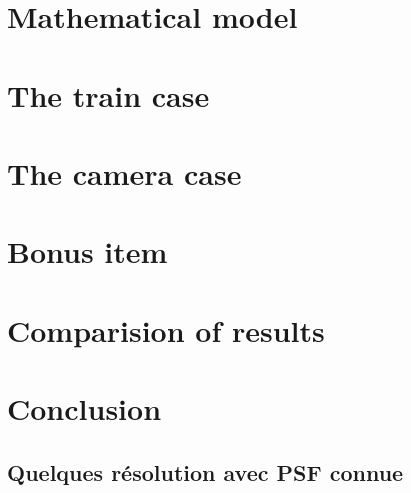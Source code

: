 \documentclass{report}
\begin{document}

\chapter{Mathematical model}

\chapter{The train case} %




\chapter{The camera case} %


\chapter{Bonus item}

\chapter{Comparision of results}


\chapter{Conclusion}

\appendix



\section{Quelques résolution avec PSF connue}
\end{document}
